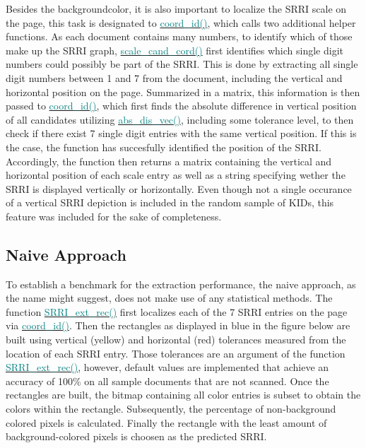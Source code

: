\documentclass[aodsor,preprint]{imsart}
\numberwithin{equation}{section}
\theoremstyle{plain}
\begin{document}
Besides the backgroundcolor, it is also important to localize the SRRI scale on the page, this task is designated to \href{https://github.com/Base-R-Best-R/KID/blob/main/Code/Package/KIDs/R/background_col_id.R}{\textcolor{teal}{coord\_id()}}, which calls two additional helper functions. As each document contains many numbers, to identify which of those make up the SRRI graph, \href{https://github.com/Base-R-Best-R/KID/blob/main/Code/Package/KIDs/R/scale_cand_coord.R}{\textcolor{teal}{scale\_cand\_cord()}} first identifies which single digit numbers could possibly be part of the SRRI. This is done by extracting all single digit numbers between 1 and 7 from the document, including the vertical and horizontal position on the page. Summarized in a matrix, this information is then passed to \href{https://github.com/Base-R-Best-R/KID/blob/main/Code/Package/KIDs/R/coord_id.R}{\textcolor{teal}{coord\_id()}}, which first finds the absolute difference in vertical position of all candidates utilizing \href{https://github.com/Base-R-Best-R/KID/blob/main/Code/Package/KIDs/R/abs_dis_vec.R}{\textcolor{teal}{abs\_dis\_vec()}}, including some tolerance level, to then check if there exist 7 single digit entries with the same vertical position. If this is the case, the function has succesfully identified the position of the SRRI. Accordingly, the function then returns a matrix containing the vertical and horizontal position of each scale entry as well as a string specifying wether the SRRI is displayed vertically or horizontally. Even though not a single occurance of a vertical SRRI depiction is included in the random sample of KIDs, this feature was included for the sake of completeness.

\subsection{Naive Approach}
To establish a benchmark for the extraction performance, the naive approach, as the name might suggest, does not make use of any statistical methods. The function \href{https://github.com/Base-R-Best-R/KID/blob/main/Code/Package/KIDs/R/SRRI_ext_rec.R}{\textcolor{teal}{SRRI\_ext\_rec()}} first localizes each of the 7 SRRI entries on the page via \href{https://github.com/Base-R-Best-R/KID/blob/main/Code/Package/KIDs/R/coord_id.R}{\textcolor{teal}{coord\_id()}}. Then the rectangles as displayed in blue in the figure below are built using vertical (yellow) and horizontal (red) tolerances measured from the location of each SRRI entry. Those tolerances are an argument of the function \href{https://github.com/Base-R-Best-R/KID/blob/main/Code/Package/KIDs/R/SRRI_ext_rec.R}{\textcolor{teal}{SRRI\_ext\_rec()}}, however, default values are implemented that achieve an accuracy of 100\% on all sample documents that are not scanned. Once the rectangles are built, the bitmap containing all color entries is subset to obtain the colors within the rectangle. Subsequently, the percentage of non-background colored pixels is calculated. Finally the rectangle with the least amount of background-colored pixels is choosen as the predicted SRRI.
\end{document}
